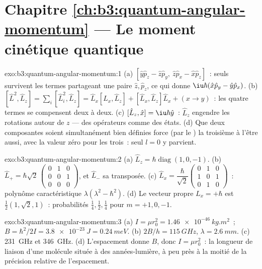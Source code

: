 \section*{Chapitre \ref{ch:b3:quantum-angular-momentum} --- Le moment cinétique quantique}

\begin{solution}{exo:b3:quantum-angular-momentum:1}
(a) $[\hat y\hat p_z - \hat z\hat p_y,\ \hat z\hat p_x - \hat x\hat
p_z]$~: seuls survivent les termes partageant une paire $\hat z, \hat p_z$,
ce qui donne $\iu\hbar(\hat x\hat p_y - \hat y\hat p_x)$. (b) $[\hat
L^2, \hat L_z] = \sum_i[\hat L_i^2, \hat L_z] = \hat L_x[\hat L_x,
\hat L_z] + [\hat L_x, \hat L_z]\hat L_x + (x \to y)$~: les quatre
termes se compensent deux à deux. (c) $[\hat L_z, \hat x] = \iu\hbar\hat y$~:
$\hat L_z$ engendre les rotations autour de $z$ --- des opérateurs
comme des états. (d) Que deux composantes soient simultanément bien
définies force (par le ) la troisième à l'être aussi, avec
la valeur zéro pour les trois~: seul $l = 0$ y parvient.
\end{solution}

\begin{solution}{exo:b3:quantum-angular-momentum:2}
(a) $\hat L_z = \hbar\operatorname{diag}(1, 0, -1)$. (b) $\hat L_+ =
\hbar\sqrt2\,\begin{pmatrix}0&1&0\\0&0&1\\0&0&0
\end{pmatrix}$, et $\hat L_-$ sa transposée. (c) $\hat L_x =
\dfrac{\hbar}{\sqrt2}\begin{pmatrix}0&1&0\\1&0&1\\0&1&0
\end{pmatrix}$~: polynôme caractéristique $\lambda(\lambda^2 -
\hbar^2)$. (d) Le vecteur propre $L_x = +\hbar$ est $\tfrac12(1,
\sqrt2, 1)$~: probabilités $\tfrac14, \tfrac12, \tfrac14$ pour $m =
+1, 0, -1$.
\end{solution}

\begin{solution}{exo:b3:quantum-angular-momentum:3}
(a) $I = \mu r_0^2 = \qty{1.46e-46}{kg.m^2}$~; $B = \hbar^2/2I =
\qty{3.8e-23}{J} = \qty{0.24}{meV}$. (b) $2B/h = \qty{115}{GHz}$,
$\lambda = \qty{2.6}{mm}$. (c) \qty{231}{GHz} et \qty{346}{GHz}.
(d) L'espacement donne $B$, donc $I = \mu r_0^2$~: la longueur de
liaison d'une molécule située à des années-lumière, à peu près à la
moitié de la précision relative de l'espacement.
\end{solution}

